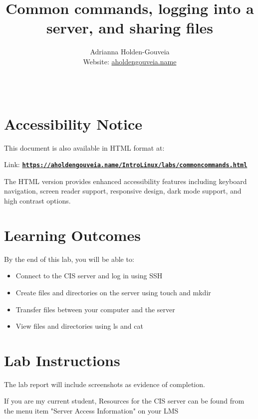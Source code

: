\documentclass[12pt]{article}
\title{Common commands, logging into a server, and sharing files}
\author{
        Adrianna Holden-Gouveia \\
        Website: \href{https://aholdengouveia.name}{aholdengouveia.name}\\ 
        \date{\vspace{-5ex}}
        \faGithub {: aholdengouveia} \\
        }
\begin{document}
    

\maketitle

\section*{Accessibility Notice}
This document is also available in HTML format at:

Link: \href{https://aholdengouveia.name/IntroLinux/labs/commoncommands.html}{\textbf{\nolinkurl{https://aholdengouveia.name/IntroLinux/labs/commoncommands.html}}}

The HTML version provides enhanced accessibility features including keyboard navigation, screen reader support, responsive design, dark mode support, and high contrast options.



\section*{Learning Outcomes}
By the end of this lab, you will be able to:
\begin{itemize}
    \item Connect to the CIS server and log in using SSH
    \item Create files and directories on the server using touch and mkdir
    \item Transfer files between your computer and the server
    \item View files and directories using ls and cat
\end{itemize}
\section*{Lab Instructions}


The lab report will include screenshots as evidence of completion.  

If you are my current student, Resources for the CIS server can be found from the menu item "Server Access Information" on your LMS
\end{document}
